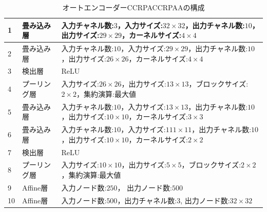 \documentclass[12pt]{jsarticle}
\begin{document}
\begin{table}[ht]
\begin{center}
\label{table:CCRPACCRPAA}
\caption{オートエンコーダーCCRPACCRPAAの構成}
\begin{tabularx}{0.9\linewidth}{|l|l|X|}
\hline
1 & 畳み込み層 & 入力チャネル数:$3$，入力サイズ:$32 \times 32$，出力チャネル数:$10$，出力サイズ:$29 \times 29$，カーネルサイズ:$4 \times 4$ \\
\hline
2& 畳み込み層 & 入力チャネル数:$10$，入力サイズ:$29 \times 29$，出力チャネル数:$10$，出力サイズ:$26 \times 26$，カーネルサイズ:$4 \times 4$ \\
\hline
3 & 検出層 & ReLU \\
\hline
4 & プーリング層 & 入力サイズ:$26 \times 26$，出力サイズ:$13 \times 13$，ブロックサイズ:$2 \times 2$，集約演算:最大値 \\
\hline
5 & 畳み込み層 & 入力チャネル数:$10$，入力サイズ:$13 \times 13$，出力チャネル数:$10$，出力サイズ:$10 \times 10$，カーネルサイズ:$3 \times 3$ \\
\hline
6 & 畳み込み層 & 入力チャネル数:$10$，入力サイズ:$111 \times 11$，出力チャネル数:$10$，出力サイズ:$10 \times 10$，カーネルサイズ:$2 \times 2$ \\
\hline
7 & 検出層 & ReLU \\
\hline
8 & プーリング層 & 入力サイズ:$10 \times 10$，出力サイズ:$5 \times 5$，ブロックサイズ:$2 \times 2$，集約演算:最大値 \\
\hline
9 & Affine層 & 入力ノード数:$250$， 出力ノード数:$ 500 $ \\
\hline
10 & Affine層 & 入力ノード数:$500$，出力チャネル数:$3$, 出力ノード数:$ 32 \times 32 $ \\
\hline
\end{tabularx}
\end{center}
\end{table}
\end{document}
